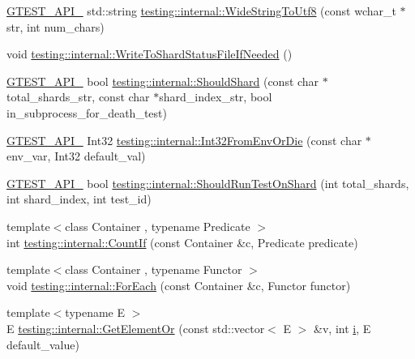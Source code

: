 \begin{DoxyCompactItemize}
\item 
\hyperlink{gtest-port_8h_aa73be6f0ba4a7456180a94904ce17790}{G\+T\+E\+S\+T\+\_\+\+A\+P\+I\+\_\+} std\+::string \hyperlink{namespacetesting_1_1internal_a05b8c86ff38243f34d8f839a0eadefb1}{testing\+::internal\+::\+Wide\+String\+To\+Utf8} (const wchar\+\_\+t $\ast$str, int num\+\_\+chars)
\item 
void \hyperlink{namespacetesting_1_1internal_a19b35b39782d41e6ef76e1910a3a502e}{testing\+::internal\+::\+Write\+To\+Shard\+Status\+File\+If\+Needed} ()
\item 
\hyperlink{gtest-port_8h_aa73be6f0ba4a7456180a94904ce17790}{G\+T\+E\+S\+T\+\_\+\+A\+P\+I\+\_\+} bool \hyperlink{namespacetesting_1_1internal_a0fe41657b1d1ab7ec4e37ec07403ee6c}{testing\+::internal\+::\+Should\+Shard} (const char $\ast$total\+\_\+shards\+\_\+str, const char $\ast$shard\+\_\+index\+\_\+str, bool in\+\_\+subprocess\+\_\+for\+\_\+death\+\_\+test)
\item 
\hyperlink{gtest-port_8h_aa73be6f0ba4a7456180a94904ce17790}{G\+T\+E\+S\+T\+\_\+\+A\+P\+I\+\_\+} Int32 \hyperlink{namespacetesting_1_1internal_aaa576613655c2f380278c255c3ec5fef}{testing\+::internal\+::\+Int32\+From\+Env\+Or\+Die} (const char $\ast$env\+\_\+var, Int32 default\+\_\+val)
\item 
\hyperlink{gtest-port_8h_aa73be6f0ba4a7456180a94904ce17790}{G\+T\+E\+S\+T\+\_\+\+A\+P\+I\+\_\+} bool \hyperlink{namespacetesting_1_1internal_a437bd89f5bc532778d7467600e210395}{testing\+::internal\+::\+Should\+Run\+Test\+On\+Shard} (int total\+\_\+shards, int shard\+\_\+index, int test\+\_\+id)
\item 
{\footnotesize template$<$class Container , typename Predicate $>$ }\\int \hyperlink{namespacetesting_1_1internal_a1e77a774d910346eff11a86d8df783a5}{testing\+::internal\+::\+Count\+If} (const Container \&c, Predicate predicate)
\item 
{\footnotesize template$<$class Container , typename Functor $>$ }\\void \hyperlink{namespacetesting_1_1internal_a52f5504ed65d116201ccb8f99a44fd7e}{testing\+::internal\+::\+For\+Each} (const Container \&c, Functor functor)
\item 
{\footnotesize template$<$typename E $>$ }\\E \hyperlink{namespacetesting_1_1internal_a71fdd20a0686bea3dc0cdcd95e0bca1c}{testing\+::internal\+::\+Get\+Element\+Or} (const std\+::vector$<$ E $>$ \&v, int \hyperlink{gtest__output__test__golden__lin_8txt_a7e98b8a17c0aad30ba64d47b74e2a6c1}{i}, E default\+\_\+value)

\end{DoxyCompactItemize}
